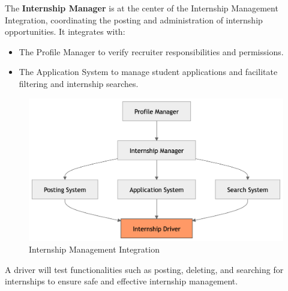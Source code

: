 The \textbf{Internship Manager} is at the center of the Internship Management Integration, coordinating the posting and administration of internship opportunities. It integrates with:
\begin{itemize}
    \item The Profile Manager to verify recruiter responsibilities and permissions.
    \item The Application System to manage student applications and facilitate filtering and internship searches.
\end{itemize}
\begin{figure}[H]
    \begin{center}
        \includegraphics[width=0.79\linewidth]{JhaBhatiaSharma/imagesDD/InternshipManagementIntegration.png}
        \caption{Internship Management Integration}
        \label{fig:internshipManagement}
    \end{center}
\end{figure}
A driver will test functionalities such as posting, deleting, and searching for internships to ensure safe and effective internship management.

